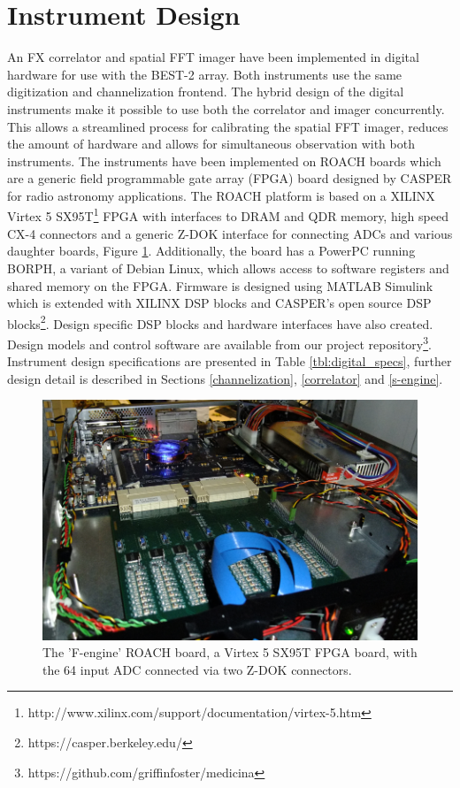 \documentclass[useAMS,macros,usenatbib]{mn2e}
\begin{document}
\section{Instrument Design}
\label{instrument design}

 An FX correlator and spatial FFT imager have been implemented in digital hardware for use with the BEST-2 array.
 Both instruments use the same digitization and channelization frontend.
 The hybrid design of the digital instruments make it possible to use both the correlator and imager concurrently.
 This allows a streamlined process for calibrating the spatial FFT imager, reduces the amount of hardware and allows for simultaneous observation with both instruments.
 The instruments have been implemented on ROACH boards which are a generic field programmable gate array (FPGA) board designed by CASPER for radio astronomy applications.
 The ROACH platform is based on a XILINX Virtex 5 SX95T\footnote{http://www.xilinx.com/support/documentation/virtex-5.htm} FPGA with interfaces to DRAM and QDR memory, high speed CX-4 connectors and a generic Z-DOK interface for connecting ADCs and various daughter boards, Figure \ref{fig:roach}.
 Additionally, the board has a PowerPC running BORPH, a variant of Debian Linux, which allows access to software registers and shared memory on the FPGA.
 Firmware is designed using MATLAB Simulink which is extended with XILINX DSP blocks and CASPER's open source DSP blocks\footnote{https://casper.berkeley.edu/}.
 Design specific DSP blocks and hardware interfaces have also created.
 Design models and control software are available from our project repository\footnote{https://github.com/griffinfoster/medicina}.
 Instrument design specifications are presented in Table \ref{tbl:digital_specs}, further design detail is described in Sections \ref{channelization}, \ref{correlator} and \ref{s-engine}.

\begin{figure}
    \centering
    \includegraphics[width=\linewidth]{graphics/roach_feng.png}
    \caption{The 'F-engine' ROACH board, a Virtex 5 SX95T FPGA board, with the 64 input ADC connected via two Z-DOK connectors.}
    \label{fig:roach}
\end{figure}
\end{document}
